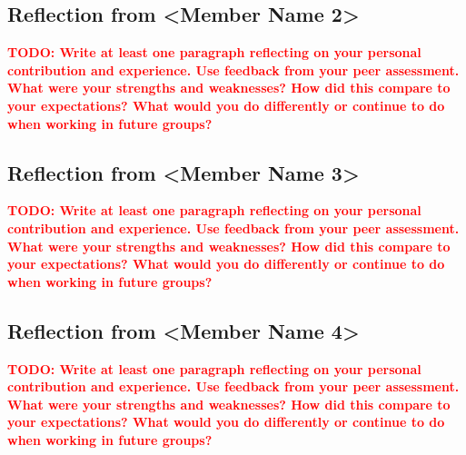 \documentclass[11pt]{article}
\newcommand{\todo}[1]{\textcolor{red}{\textbf{TODO: #1}}}
\begin{document}
\subsection{Reflection from <Member Name 2>}
\todo{Write at least one paragraph reflecting on your personal contribution and experience. Use feedback from your peer assessment. What were your strengths and weaknesses? How did this compare to your expectations? What would you do differently or continue to do when working in future groups?}

\subsection{Reflection from <Member Name 3>}
\todo{Write at least one paragraph reflecting on your personal contribution and experience. Use feedback from your peer assessment. What were your strengths and weaknesses? How did this compare to your expectations? What would you do differently or continue to do when working in future groups?}

\subsection{Reflection from <Member Name 4>}
\todo{Write at least one paragraph reflecting on your personal contribution and experience. Use feedback from your peer assessment. What were your strengths and weaknesses? How did this compare to your expectations? What would you do differently or continue to do when working in future groups?}
\end{document}
